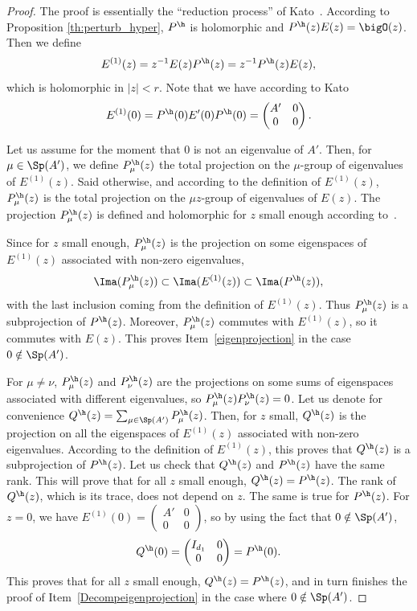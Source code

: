 \begin{proof}
The proof is essentially the ``reduction process'' of Kato~\cite[Ch.\,II, \S2.3]{kato_1995}.
According to Proposition \ref{th:perturb_hyper}, $P^\h$ is holomorphic and $P^\h(z)E(z) = \bigO(z)$. Then we define
\[
E^{(1)}(z) = z^{-1} E(z) P^\h(z) = z^{-1} P^\h(z)E(z),
\]
which is holomorphic in $|z|<r$. Note that we have according to Kato~\cite[Ch.\,II, Eq.\,(2.38)]{kato_1995}
\[
E^{(1)}(0) = P^\h(0)E'(0)P^\h(0) = \begin{pmatrix}A'&0\\0&0\end{pmatrix}.
\]

Let us assume for the moment that $0$ is not an eigenvalue of $A'$. Then, for $\mu\in \Sp(A')$, we define $P_\mu^\h(z)$ the total projection on the $\mu$-group of eigenvalues of $E^{(1)}(z)$. Said otherwise, and according to the definition of $E^{(1)}(z)$, $P^\h_\mu(z)$ is the total projection on the $\mu z$-group of eigenvalues of $E(z)$. The projection $P_\mu^\h(z)$ is defined and holomorphic for $z$ small enough according to~\cite[Ch.\,II, \S1.4]{kato_1995}.

Since for $z$ small enough, $P_\mu^\h(z)$ is the projection on some eigenspaces of $E^{(1)}(z)$ associated with non-zero eigenvalues,
\[
\Ima(P_\mu^\h(z))\subset\Ima(E^{(1)}(z)) \subset \Ima(P^\h(z)),
\]
with the last inclusion coming from the definition of $E^{(1)}(z)$. Thus $P_\mu^\h(z)$ is a subprojection of $P^\h(z)$. Moreover, $P_\mu^\h(z)$ commutes with $E^{(1)}(z)$, so it commutes with $E(z)$. This proves Item~\eqref{eigenprojection} in the case $0\notin \Sp(A')$.

For $\mu\neq \nu$, $P_\mu^\h(z)$ and $P_\nu^\h(z)$ are the projections on some sums of eigenspaces associated with different eigenvalues, so $P_\mu^\h(z)P_\nu^\h(z) = 0$. Let us denote for convenience $Q^\h(z) = \sum_{\mu\in\Sp(A')} P_\mu^\h(z)$. Then, for $z$ small, $Q^\h(z)$ is the projection on all the eigenspaces of $E^{(1)}(z)$ associated with non-zero eigenvalues. According to the definition of $E^{(1)}(z)$, this proves that $Q^\h(z)$ is a subprojection of $P^\h(z)$. Let us check that $Q^\h(z)$ and $P^\h(z)$ have the same rank. This will prove that for all $z$ small enough, $Q^\h(z) = P^\h(z)$. The rank of $Q^\h(z)$, which is its trace, does not depend on $z$. The same is true for $P^\h(z)$. For $z=0$, we have $E^{(1)}(0) = (\begin{smallmatrix} A'&0\\0&0 \end{smallmatrix})$, so by using the fact that $0\notin \Sp(A')$,
\[
Q^\h(0) = \begin{pmatrix} I_{d_1}&0\\0&0 \end{pmatrix} = P^\h(0).
\]
This proves that for all $z$ small enough, $Q^\h(z) = P^\h(z)$, and in turn finishes the proof of Item~\eqref{Decompeigenprojection} in the case where $0\notin\Sp(A')$.


\end{proof}
